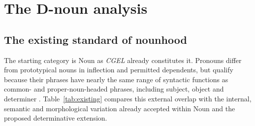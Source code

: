 \documentclass[12pt]{article}
\begin{document}
\section{The D-noun analysis}\label{sec:proposal}

\subsection{The existing standard of nounhood}\label{sec:membership}

The starting category is Noun as \textit{CGEL} already constitutes it. Pronouns differ from prototypical nouns in inflection and permitted dependents, but qualify because their phrases have nearly the same range of syntactic functions as common- and proper-noun-headed phrases, including subject, object and determiner \citep[327]{huddleston2002}. Table~\ref{tab:existing} compares this external overlap with the internal, semantic and morphological variation already accepted within Noun and the proposed determinative extension.
\end{document}
